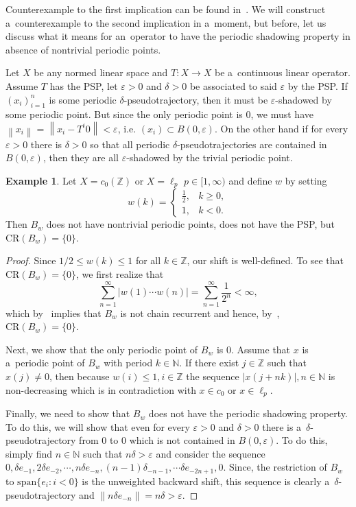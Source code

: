 \documentclass[11pt,a4paper]{amsart}
\theoremstyle{definition}
\newtheorem{example}[theorem]{Example}
\newcommand{\Z}{\mathbb{Z}}
\newcommand{\N}{\mathbb{N}}
\newcommand{\eps}{\varepsilon}
\newcommand{\abs}[1]{\left| #1 \right|}
\newcommand{\norm}[1]{\left\| #1 \right\|}
\newcommand{\CR}{\mathrm{CR}}
\newcommand{\linsp}{\mathrm{span}}
\begin{document}
	Counterexample to the first implication can be found in~\cite[Corollary~23]{Shadowing_and_chain_rec}.
	We will construct a~counterexample to the second implication in a~moment, but before, let us discuss what it means for an~operator to have the periodic shadowing property in absence of nontrivial periodic points.
	
	Let $X$ be any normed linear space and $T: X \to X$ be a~continuous linear operator.
	Assume $T$ has the PSP, let $\eps > 0$ and $\delta > 0$ be associated to said $\eps$ by the PSP. If $(x_i)_{i=1}^n$ is some periodic $\delta$-pseudotrajectory, then it must be $\eps$-shadowed by some periodic point. But since the only periodic point is $0$, we must have $\norm{x_i} = \norm{x_i - T^i 0} < \eps$, i.e. $(x_i) \subset B(0, \eps)$. On the other hand if for every $\eps > 0$ there is $\delta > 0$ so that all periodic $\delta$-pseudotrajectories are contained in $B(0, \eps)$, then they are all $\eps$-shadowed by the trivial periodic point.
	\begin{example} \label{ex:TrivCRbutNotPSP}
		Let $X = c_0(\Z)$ or \(X = \ell_p\) \(p \in [1,\infty)\) and define $w$ by setting 
		\begin{equation*}
			w(k) = \begin{cases}
				\frac{1}{2}, &k \geq 0,\\
				1, &k < 0.
			\end{cases}
		\end{equation*}
		Then $B_w$ does not have nontrivial periodic points, does not have the PSP, but $\CR(B_w) = \{0\}$.
	\end{example}
	\begin{proof}
		Since $1/2 \leq w(k) \leq 1$ for all $k \in \Z$, our shift is well-defined. To see that $\CR(B_w) = \{0\}$, we first realize that
		\begin{equation*}
			\sum_{n=1}^{\infty} \abs{w(1)\cdots w(n)} = \sum_{n=1}^\infty \frac{1}{2^n} < \infty,
		\end{equation*}
		which by~\cite[Theorem~14]{Shadowing_and_chain_rec} implies that $B_w$ is not chain recurrent and hence, by~, $\CR(B_w) = \{0\}$.
		
		Next, we show that the only periodic point of $B_w$ is $0$. Assume that $x$ is a~periodic point of $B_w$ with period $k \in \N$. If there exist $j \in \Z$ such that $x(j) \neq 0$, then because $w(i) \leq 1, i \in \Z$ the sequence $\abs{x(j + nk)}, n \in \N$ is non-decreasing which is in contradiction with $x \in c_0$ or \(x \in \ell_p\).
		
		Finally, we need to show that $B_w$ does not have the periodic shadowing property. To do this, we will show that even for every $\eps > 0$ and $\delta > 0$ there is a~$\delta$-pseudotrajectory from $0$ to $0$ which is not contained in $B(0, \eps)$. To do this, simply find $n \in \N$ such that $n\delta > \eps$ and consider the sequence $0, \delta e_{-1}, 2\delta e_{-2}, \cdots, n\delta e_{-n}, (n-1)\delta_{-n-1}, \cdots \delta e_{-2n+1}, 0$. Since, the restriction of $B_w$ to $\linsp \{e_i : i < 0\}$ is the unweighted backward shift, this sequence is clearly a~$\delta$-pseudotrajectory and $\norm{n\delta e_{-n}} = n\delta > \eps$.
	\end{proof}
	
\end{document}
